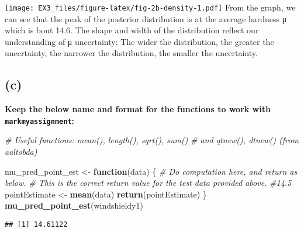 \documentclass[
]{article}
\newenvironment{Shaded}{\begin{snugshade}}{\end{snugshade}}
\newcommand{\CommentTok}[1]{\textcolor[rgb]{0.56,0.35,0.01}{\textit{#1}}}
\newcommand{\ControlFlowTok}[1]{\textcolor[rgb]{0.13,0.29,0.53}{\textbf{#1}}}
\newcommand{\FunctionTok}[1]{\textcolor[rgb]{0.13,0.29,0.53}{\textbf{#1}}}
\newcommand{\NormalTok}[1]{#1}
\newcommand{\OtherTok}[1]{\textcolor[rgb]{0.56,0.35,0.01}{#1}}
\begin{document}
\texttt{[image: EX3\_files/figure-latex/fig-2b-density-1.pdf]} From the
graph, we can see that the peak of the posterior distribution is at the
average hardness μ which is bout 14.6. The shape and width of the
distribution reflect our understanding of μ uncertainty: The wider the
distribution, the greater the uncertainty, the narrower the
distribution, the smaller the uncertainty.

\hypertarget{c}{%
\subsection{(c)}\label{c}}

\textbf{Keep the below name and format for the functions to work with
\texttt{markmyassignment}:}

\begin{Shaded}
\begin{Highlighting}[]
\CommentTok{\# Useful functions: mean(), length(), sqrt(), sum()}
\CommentTok{\# and qtnew(), dtnew() (from aaltobda)}

\NormalTok{mu\_pred\_point\_est }\OtherTok{\textless{}{-}} \ControlFlowTok{function}\NormalTok{(data) \{}
    \CommentTok{\# Do computation here, and return as below.}
    \CommentTok{\# This is the correct return value for the test data provided above.}
    \CommentTok{\#14.5}
\NormalTok{    pointEstimate }\OtherTok{\textless{}{-}} \FunctionTok{mean}\NormalTok{(data)}
    \FunctionTok{return}\NormalTok{(pointEstimate)}
\NormalTok{\}}
\FunctionTok{mu\_pred\_point\_est}\NormalTok{(windshieldy1)}
\end{Highlighting}
\end{Shaded}

\begin{verbatim}
## [1] 14.61122
\end{verbatim}
\end{document}
